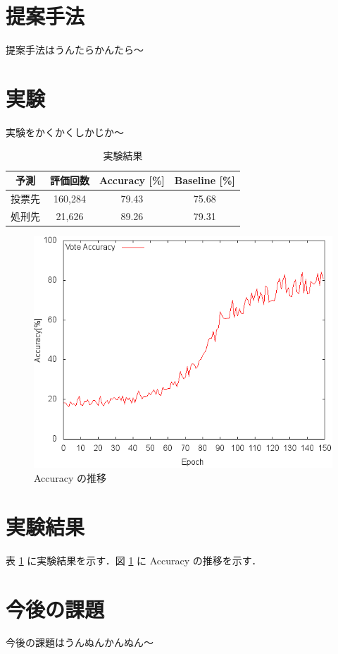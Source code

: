 \documentclass[twocolumn]{jarticle}     %
\begin{document}
\section{提案手法}
提案手法はうんたらかんたら〜

\section{実験}
実験をかくかくしかじか〜

	\begin{table}
		\caption{実験結果}
		\begin{tabular}[width=\linewidth]{c| c c c} \hline
			予測 & 評価回数 & Accuracy [\%] & Baseline [\%] \\ \hline 
			投票先 & 160,284 & 79.43 & 75.68 \\ 
			処刑先 & 21,626 & 89.26 & 79.31 \\ \hline
 		\end{tabular}
		\label{tb:data}
	\end{table}

	\begin{figure}
		\includegraphics[width=\linewidth]{accuracy.png}		%
		\caption{Accuracy の推移}
		\label{fig:accuracy}
	\end{figure}


\section{実験結果}
表 \ref{tb:data} に実験結果を示す．図 \ref{fig:accuracy} に Accuracy の推移を示す．

\section{今後の課題}
今後の課題はうんぬんかんぬん〜


\end{document}
